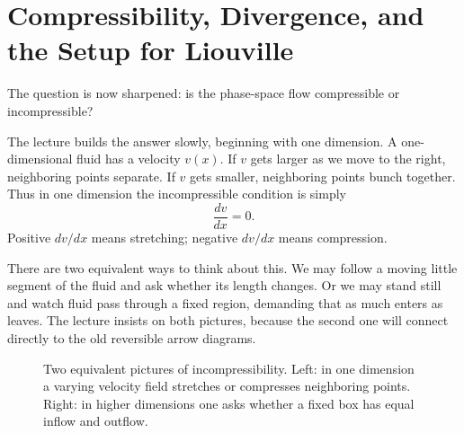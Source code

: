 \section{Compressibility, Divergence, and the Setup for Liouville}

The question is now sharpened: is the phase-space flow compressible or incompressible?

The lecture builds the answer slowly, beginning with one dimension. A one-dimensional fluid has a velocity \(v(x)\). If \(v\) gets larger as we move to the right, neighboring points separate. If \(v\) gets smaller, neighboring points bunch together. Thus in one dimension the incompressible condition is simply
\begin{equation}
\frac{dv}{dx}=0.
\end{equation}
Positive \(dv/dx\) means stretching; negative \(dv/dx\) means compression.

There are two equivalent ways to think about this. We may follow a moving little segment of the fluid and ask whether its length changes. Or we may stand still and watch fluid pass through a fixed region, demanding that as much enters as leaves. The lecture insists on both pictures, because the second one will connect directly to the old reversible arrow diagrams.

\begin{figure}[h]
\centering
{}
\hspace{1.0cm}
\caption{Two equivalent pictures of incompressibility. Left: in one dimension a varying velocity field stretches or compresses neighboring points. Right: in higher dimensions one asks whether a fixed box has equal inflow and outflow.}
\end{figure}

